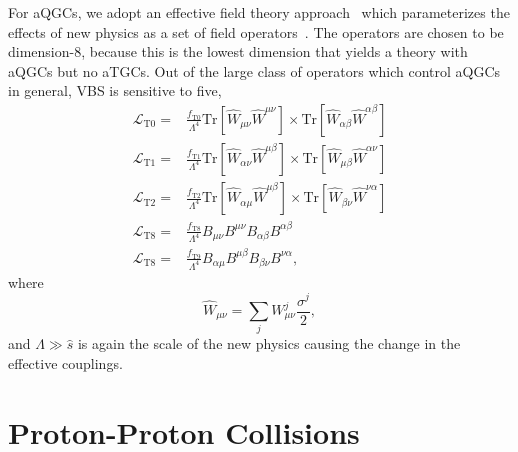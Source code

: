 For aQGCs, we adopt an effective field theory approach~\cite{Degrande:2012wf} which parameterizes the effects of new physics as a set of field operators~\cite{Eboli:2006wa}.
The operators are chosen to be dimension-8, because this is the lowest dimension that yields a theory with aQGCs but no aTGCs.
Out of the large class of operators which control aQGCs in general, {\ZZ} VBS is sensitive to five,
\begin{equation}
  \begin{aligned}
    \mathcal{L}_\text{T0} = & \frac{f_\text{T0}}{\Lambda^4} \text{Tr}\left[\hat{W}_{\mu\nu} \hat{W}^{\mu\nu}\right] \times \text{Tr}\left[\hat{W}_{\alpha\beta} \hat{W}^{\alpha\beta}\right] \\
    \mathcal{L}_\text{T1} = & \frac{f_\text{T1}}{\Lambda^4} \text{Tr}\left[\hat{W}_{\alpha\nu} \hat{W}^{\mu\beta}\right] \times \text{Tr}\left[\hat{W}_{\mu\beta} \hat{W}^{\alpha\nu}\right] \\
    \mathcal{L}_\text{T2} = & \frac{f_\text{T2}}{\Lambda^4} \text{Tr}\left[\hat{W}_{\alpha\mu} \hat{W}^{\mu\beta}\right] \times \text{Tr}\left[\hat{W}_{\beta\nu} \hat{W}^{\nu\alpha}\right] \\
    \mathcal{L}_\text{T8} = & \frac{f_\text{T8}}{\Lambda^4} B_{\mu\nu}B^{\mu\nu} B_{\alpha\beta}B^{\alpha\beta} \\
    \mathcal{L}_\text{T8} = & \frac{f_\text{T9}}{\Lambda^4} B_{\alpha\mu}B^{\mu\beta} B_{\beta\nu}B^{\nu\alpha},
  \end{aligned}
\end{equation}
where
\begin{equation}
  \hat{W}_{\mu\nu} = \sum_j W_{\mu\nu}^j \frac{\sigma^j}{2},
\end{equation}
and $\Lambda \gg \hat{s}$ is again the scale of the new physics causing the change in the effective couplings.



\section{Proton-Proton Collisions}\label{sec:pp}

